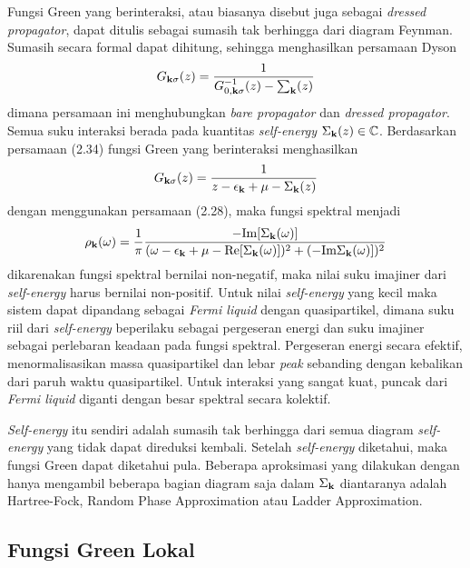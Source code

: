 Fungsi Green yang berinteraksi, atau biasanya disebut juga sebagai \textit{dressed propagator}, dapat ditulis sebagai sumasih tak berhingga dari diagram Feynman\cite{spektral}. Sumasih secara formal dapat dihitung, sehingga menghasilkan persamaan Dyson
\begin{align}
G_{\textbf{k}\sigma}(z) = \frac{1}{G^{-1}_{0,\textbf{k}\sigma}(z) - \sum_{\textbf{k}}(z)}
\end{align}
dimana persamaan ini menghubungkan \textit{bare propagator} dan \textit{dressed propagator}. Semua suku interaksi berada pada kuantitas \textit{self-energy} $\Sigma_{\textbf{k}}(z) \in \mathbb{C}$. Berdasarkan persamaan (2.34) fungsi Green yang berinteraksi menghasilkan 
\begin{align}
G_{\textbf{k}\sigma}(z) = \frac{1}{z - \epsilon_{\textbf{k}} + \mu - \Sigma_{\textbf{k}}(z)}
\end{align}
dengan menggunakan persamaan (2.28), maka fungsi spektral menjadi
\begin{align}
\rho_{\textbf{k}}(\omega) = \frac{1}{\pi} \frac{-\text{Im}[\Sigma_{\textbf{k}}(\omega)]}{(\omega - \epsilon_{\textbf{k}} + \mu - \text{Re}[\Sigma_{\textbf{k}}(\omega)])^2 + (-\text{Im}\Sigma_{\textbf{k}}(\omega)])^2}
\end{align}
dikarenakan fungsi spektral bernilai non-negatif, maka nilai suku imajiner dari \textit{self-energy} harus bernilai non-positif. Untuk nilai \textit{self-energy} yang kecil maka sistem dapat dipandang sebagai \textit{Fermi liquid} dengan quasipartikel, dimana suku riil dari \textit{self-energy} beperilaku sebagai pergeseran energi dan suku imajiner sebagai perlebaran keadaan pada fungsi spektral. Pergeseran energi secara efektif, menormalisasikan massa quasipartikel dan lebar \textit{peak} sebanding dengan kebalikan dari paruh waktu quasipartikel. Untuk interaksi yang sangat kuat, puncak dari \textit{Fermi liquid} diganti dengan besar spektral secara kolektif.

\textit{Self-energy} itu sendiri adalah sumasih tak berhingga dari semua diagram \textit{self-energy} yang tidak dapat direduksi kembali. Setelah \textit{self-energy} diketahui, maka fungsi Green dapat diketahui pula. Beberapa aproksimasi yang dilakukan dengan hanya mengambil beberapa bagian diagram saja dalam $\Sigma_{\textbf{k}}$ diantaranya adalah Hartree-Fock, Random Phase Approximation atau Ladder Approximation\cite{ladder}. 

\subsection{Fungsi Green Lokal}

